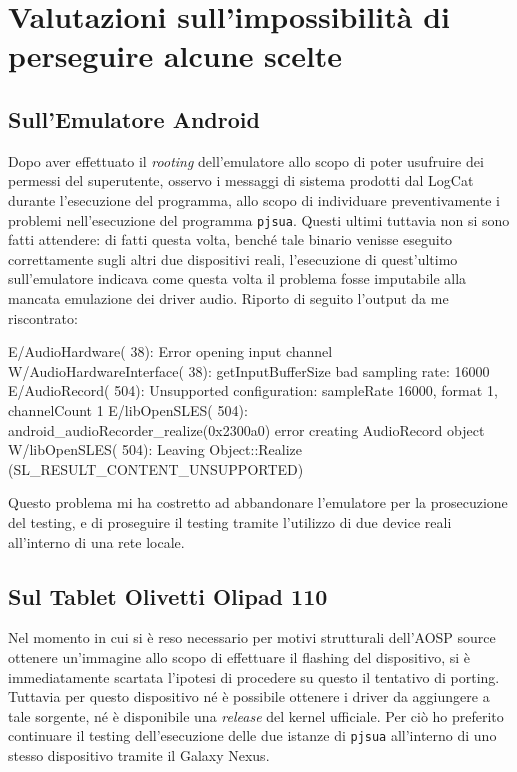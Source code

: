 \section{Valutazioni sull'impossibilità di perseguire alcune scelte}
\subsection{Sull'Emulatore Android}\label{subsec:impossibemuandroid}
Dopo aver effettuato il \textit{rooting} dell'emulatore allo scopo di poter usufruire dei permessi del superutente, osservo i messaggi di sistema prodotti dal LogCat durante l'esecuzione del programma, allo scopo di individuare preventivamente i problemi nell'esecuzione del programma \texttt{pjsua}. Questi ultimi tuttavia non si sono fatti attendere: di fatti questa volta, benché tale binario venisse eseguito correttamente sugli altri due dispositivi reali, l'esecuzione di quest'ultimo sull'emulatore indicava come questa volta il problema fosse imputabile alla mancata emulazione dei driver audio. Riporto di seguito l'output da me riscontrato:

\begin{bash}  
E/AudioHardware(   38): Error opening input channel
W/AudioHardwareInterface(   38): getInputBufferSize bad sampling rate: 16000
E/AudioRecord(  504): Unsupported configuration: sampleRate 16000, format 1, channelCount 1
E/libOpenSLES(  504): android_audioRecorder_realize(0x2300a0) error creating AudioRecord object
W/libOpenSLES(  504): Leaving Object::Realize (SL_RESULT_CONTENT_UNSUPPORTED)
\end{bash}

Questo problema mi ha costretto ad abbandonare l'emulatore per la prosecuzione del testing,
e di proseguire il testing tramite l'utilizzo di due device reali all'interno di una rete locale.

\subsection{Sul Tablet Olivetti Olipad 110}\label{subsec:impossiboliandroid}
Nel momento in cui si è reso necessario per motivi strutturali dell'AOSP source ottenere un'immagine 
allo scopo di effettuare il flashing del dispositivo, si è immediatamente scartata 
l'ipotesi di procedere su questo il tentativo di porting. Tuttavia per questo dispositivo
né è possibile ottenere i driver da aggiungere a tale sorgente, né
è disponibile una \textit{release} del kernel ufficiale. Per ciò ho preferito continuare
il testing dell'esecuzione delle due istanze di \texttt{pjsua} all'interno di uno
stesso dispositivo tramite il Galaxy Nexus.
